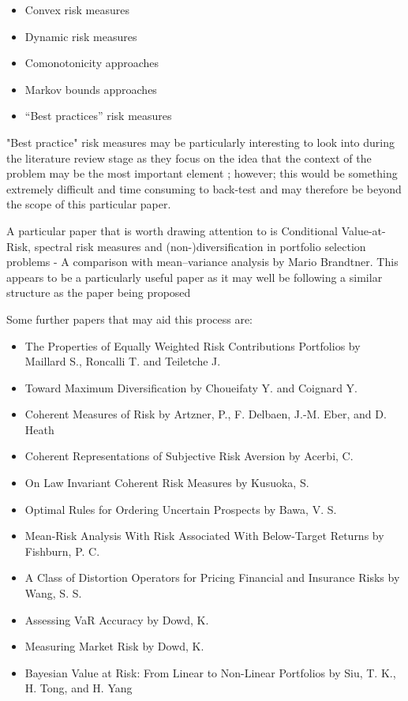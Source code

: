 \documentclass[12pt,a4paper]{article}
\newcommand{\bi}{\begin{itemize}}
\newcommand{\ei}{\end{itemize}}
\begin{document}
\bi
\item Convex risk measures
\item Dynamic risk measures
\item Comonotonicity approaches
\item Markov bounds approaches
\item “Best practices” risk measures
\ei
 
 "Best practice" risk measures may be particularly interesting to look into during the literature review stage as they focus on the idea that the context of the problem may be the most important element \citep{dowd2006after}; however; this would be something extremely difficult and time consuming to back-test and may therefore be beyond the scope of this particular paper.

A particular paper that is worth drawing attention to is Conditional Value-at-Risk, spectral risk measures and
(non-)diversification in portfolio selection problems - A comparison with mean–variance analysis by Mario Brandtner. This appears to be a particularly useful paper as it may well be following a similar structure as the paper being proposed

Some further papers that may aid this process are: 
\bi
\item  The Properties of Equally Weighted Risk Contributions Portfolios by Maillard S., Roncalli T. and Teiletche J. 
\item Toward Maximum Diversification by Choueifaty Y. and Coignard Y.
\item Coherent Measures of Risk by Artzner, P., F. Delbaen, J.-M. Eber, and D. Heath
\item Coherent Representations of Subjective Risk Aversion by Acerbi, C. 
\item  On Law Invariant Coherent Risk Measures by Kusuoka, S.
\item  Optimal Rules for Ordering Uncertain Prospects by Bawa, V. S.
\item Mean-Risk Analysis With Risk Associated With Below-Target Returns by Fishburn, P. C.
\item  A Class of Distortion Operators for Pricing Financial and Insurance Risks by Wang, S. S.
\item  Assessing VaR Accuracy by Dowd, K.
\item  Measuring Market Risk by Dowd, K. 
\item Bayesian Value at Risk: From Linear to Non-Linear Portfolios by Siu, T. K., H. Tong, and H. Yang
\ei
\end{document}
